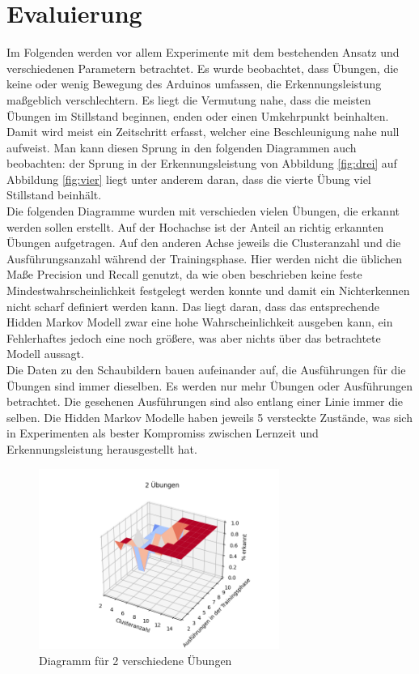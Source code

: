 \documentclass{article}
\begin{document}
\newpage
\section{Evaluierung}
\label{sec:evaluation}
Im Folgenden werden vor allem Experimente mit dem bestehenden Ansatz und verschiedenen Parametern betrachtet.
Es wurde beobachtet, dass Übungen, die keine oder wenig Bewegung des Arduinos umfassen, die Erkennungsleistung maßgeblich verschlechtern.
Es liegt die Vermutung nahe, dass die meisten Übungen im Stillstand beginnen, enden oder einen \glqq Umkehrpunkt\grqq{} beinhalten.
Damit wird meist ein Zeitschritt erfasst, welcher eine Beschleunigung nahe null aufweist.
Man kann diesen Sprung in den folgenden Diagrammen auch beobachten: der Sprung in der Erkennungsleistung von Abbildung \ref{fig:drei} auf Abbildung \ref{fig:vier} liegt unter anderem daran, dass die vierte Übung viel Stillstand beinhält.\\
Die folgenden Diagramme wurden mit verschieden vielen Übungen, die erkannt werden sollen erstellt.
Auf der Hochachse ist der Anteil an richtig erkannten Übungen aufgetragen.
Auf den anderen Achse jeweils die Clusteranzahl und die Ausführungsanzahl während der Trainingsphase.
Hier werden nicht die üblichen Maße Precision und Recall genutzt, da wie oben beschrieben keine feste Mindestwahrscheinlichkeit festgelegt werden konnte und damit ein Nichterkennen nicht scharf definiert werden kann.
Das liegt daran, dass das entsprechende Hidden Markov Modell zwar eine hohe Wahrscheinlichkeit ausgeben kann, ein Fehlerhaftes jedoch eine noch größere, was aber nichts über das betrachtete Modell aussagt.\\
Die Daten zu den Schaubildern bauen aufeinander auf, die Ausführungen für die Übungen sind immer dieselben.
Es werden nur mehr Übungen oder Ausführungen betrachtet.
Die gesehenen Ausführungen sind also entlang einer Linie immer die selben.
Die Hidden Markov Modelle haben jeweils 5 versteckte Zustände, was sich in Experimenten als bester Kompromiss zwischen Lernzeit und Erkennungsleistung herausgestellt hat.
\medskip
\begin{figure}[h]
\centering
\includegraphics[width=0.7\textwidth]{figures/2_graph.png}
\caption{Diagramm für 2 verschiedene Übungen}
\label{fig:zwei}
\end{figure}\\
\end{document}
